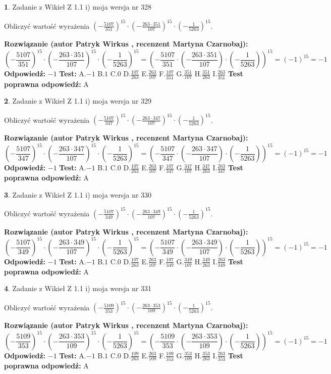 \documentclass[12pt, a4paper]{article}
\theoremstyle{definition} %
\newtheorem{zad}{}
\newcommand{\zadStart}[1]{\begin{zad}#1\newline}
\newcommand{\zadStop}{\end{zad}}
\newcommand{\rozwStart}[2]{\noindent \textbf{Rozwiązanie (autor #1 , recenzent #2): }\newline}
\newcommand{\rozwStop}{\newline}
\newcommand{\odpStart}{\noindent \textbf{Odpowiedź:}\newline}
\newcommand{\odpStop}{\newline}
\newcommand{\testStart}{\noindent \textbf{Test:}\newline}
\newcommand{\testStop}{\newline}
\newcommand{\kluczStart}{\noindent \textbf{Test poprawna odpowiedź:}\newline}
\newcommand{\kluczStop}{\newline}
\begin{document}
\zadStart{Zadanie z Wikieł Z 1.1 i) moja wersja nr 328}

Obliczyć wartość wyrażenia $(-\frac{5107}{351})^{15} \cdot (-\frac{263 \cdot 351}{107})^{15} \cdot (-\frac{1}{5263})^{15}$.
\zadStop
\rozwStart{Patryk Wirkus}{Martyna Czarnobaj}
$$(-\frac{5107}{351})^{15} \cdot (-\frac{263 \cdot 351}{107})^{15} \cdot (-\frac{1}{5263})^{15} = (-\frac{5107}{351} \cdot (-\frac{263 \cdot 351}{107}) \cdot (-\frac{1}{5263}))^{15} = (-1)^{15} = -1$$
\rozwStop
\odpStart
$-1$
\odpStop
\testStart
A.$-1$ B.$1$ C.$0$ D.$\frac{107}{263}$ E.$\frac{263}{107}$
F.$\frac{107}{351}$ G.$\frac{351}{107}$
H.$\frac{351}{263}$
I.$\frac{263}{351}$
\testStop
\kluczStart
A
\kluczStop



\zadStart{Zadanie z Wikieł Z 1.1 i) moja wersja nr 329}

Obliczyć wartość wyrażenia $(-\frac{5107}{347})^{15} \cdot (-\frac{263 \cdot 347}{107})^{15} \cdot (-\frac{1}{5263})^{15}$.
\zadStop
\rozwStart{Patryk Wirkus}{Martyna Czarnobaj}
$$(-\frac{5107}{347})^{15} \cdot (-\frac{263 \cdot 347}{107})^{15} \cdot (-\frac{1}{5263})^{15} = (-\frac{5107}{347} \cdot (-\frac{263 \cdot 347}{107}) \cdot (-\frac{1}{5263}))^{15} = (-1)^{15} = -1$$
\rozwStop
\odpStart
$-1$
\odpStop
\testStart
A.$-1$ B.$1$ C.$0$ D.$\frac{107}{263}$ E.$\frac{263}{107}$
F.$\frac{107}{347}$ G.$\frac{347}{107}$
H.$\frac{347}{263}$
I.$\frac{263}{347}$
\testStop
\kluczStart
A
\kluczStop



\zadStart{Zadanie z Wikieł Z 1.1 i) moja wersja nr 330}

Obliczyć wartość wyrażenia $(-\frac{5107}{349})^{15} \cdot (-\frac{263 \cdot 349}{107})^{15} \cdot (-\frac{1}{5263})^{15}$.
\zadStop
\rozwStart{Patryk Wirkus}{Martyna Czarnobaj}
$$(-\frac{5107}{349})^{15} \cdot (-\frac{263 \cdot 349}{107})^{15} \cdot (-\frac{1}{5263})^{15} = (-\frac{5107}{349} \cdot (-\frac{263 \cdot 349}{107}) \cdot (-\frac{1}{5263}))^{15} = (-1)^{15} = -1$$
\rozwStop
\odpStart
$-1$
\odpStop
\testStart
A.$-1$ B.$1$ C.$0$ D.$\frac{107}{263}$ E.$\frac{263}{107}$
F.$\frac{107}{349}$ G.$\frac{349}{107}$
H.$\frac{349}{263}$
I.$\frac{263}{349}$
\testStop
\kluczStart
A
\kluczStop



\zadStart{Zadanie z Wikieł Z 1.1 i) moja wersja nr 331}

Obliczyć wartość wyrażenia $(-\frac{5109}{353})^{15} \cdot (-\frac{263 \cdot 353}{109})^{15} \cdot (-\frac{1}{5263})^{15}$.
\zadStop
\rozwStart{Patryk Wirkus}{Martyna Czarnobaj}
$$(-\frac{5109}{353})^{15} \cdot (-\frac{263 \cdot 353}{109})^{15} \cdot (-\frac{1}{5263})^{15} = (-\frac{5109}{353} \cdot (-\frac{263 \cdot 353}{109}) \cdot (-\frac{1}{5263}))^{15} = (-1)^{15} = -1$$
\rozwStop
\odpStart
$-1$
\odpStop
\testStart
A.$-1$ B.$1$ C.$0$ D.$\frac{109}{263}$ E.$\frac{263}{109}$
F.$\frac{109}{353}$ G.$\frac{353}{109}$
H.$\frac{353}{263}$
I.$\frac{263}{353}$
\testStop
\kluczStart
A
\kluczStop
\end{document}
